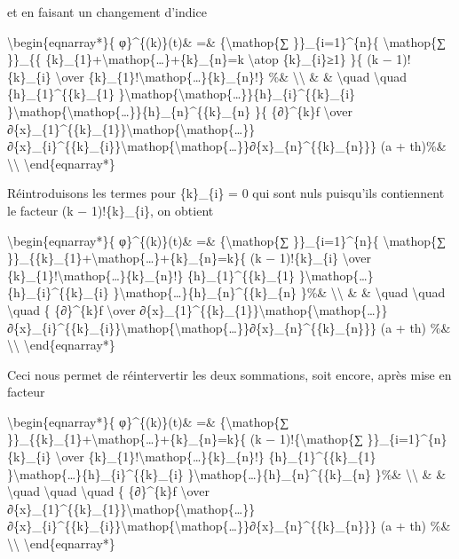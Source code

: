 \documentclass[]{article}
\begin{document}
et en faisant un changement d'indice

\textbackslash{}begin\{eqnarray*\}\{ φ\}\^{}\{(k)\}(t)\& =\&
\{\textbackslash{}mathop\{∑ \}\}\_\{i=1\}\^{}\{n\}\{
\textbackslash{}mathop\{∑ \}\}\_\{\{
\{k\}\_\{1\}+\textbackslash{}mathop\{\ldots{}\}+\{k\}\_\{n\}=k
\textbackslash{}atop \{k\}\_\{i\}≥1\} \}\{ (k − 1)!\{k\}\_\{i\}
\textbackslash{}over
\{k\}\_\{1\}!\textbackslash{}mathop\{\ldots{}\}\{k\}\_\{n\}!\} \%\&
\textbackslash{}\textbackslash{} \& \& \textbackslash{}quad
\textbackslash{}quad \{h\}\_\{1\}\^{}\{\{k\}\_\{1\}
\}\textbackslash{}mathop\{\textbackslash{}mathop\{\ldots{}\}\}\{h\}\_\{i\}\^{}\{\{k\}\_\{i\}
\}\textbackslash{}mathop\{\textbackslash{}mathop\{\ldots{}\}\}\{h\}\_\{n\}\^{}\{\{k\}\_\{n\}
\}\{ \{∂\}\^{}\{k\}f \textbackslash{}over
∂\{x\}\_\{1\}\^{}\{\{k\}\_\{1\}\}\textbackslash{}mathop\{\textbackslash{}mathop\{\ldots{}\}\}∂\{x\}\_\{i\}\^{}\{\{k\}\_\{i\}\}\textbackslash{}mathop\{\textbackslash{}mathop\{\ldots{}\}\}∂\{x\}\_\{n\}\^{}\{\{k\}\_\{n\}\}\}
(a + th)\%\& \textbackslash{}\textbackslash{}
\textbackslash{}end\{eqnarray*\}

Réintroduisons les termes pour \{k\}\_\{i\} = 0 qui sont nuls puisqu'ils
contiennent le facteur (k − 1)!\{k\}\_\{i\}, on obtient

\textbackslash{}begin\{eqnarray*\}\{ φ\}\^{}\{(k)\}(t)\& =\&
\{\textbackslash{}mathop\{∑ \}\}\_\{i=1\}\^{}\{n\}\{
\textbackslash{}mathop\{∑
\}\}\_\{\{k\}\_\{1\}+\textbackslash{}mathop\{\ldots{}\}+\{k\}\_\{n\}=k\}\{
(k − 1)!\{k\}\_\{i\} \textbackslash{}over
\{k\}\_\{1\}!\textbackslash{}mathop\{\ldots{}\}\{k\}\_\{n\}!\}
\{h\}\_\{1\}\^{}\{\{k\}\_\{1\}
\}\textbackslash{}mathop\{\ldots{}\}\{h\}\_\{i\}\^{}\{\{k\}\_\{i\}
\}\textbackslash{}mathop\{\ldots{}\}\{h\}\_\{n\}\^{}\{\{k\}\_\{n\}
\}\%\& \textbackslash{}\textbackslash{} \& \& \textbackslash{}quad
\textbackslash{}quad \textbackslash{}quad \{ \{∂\}\^{}\{k\}f
\textbackslash{}over
∂\{x\}\_\{1\}\^{}\{\{k\}\_\{1\}\}\textbackslash{}mathop\{\textbackslash{}mathop\{\ldots{}\}\}∂\{x\}\_\{i\}\^{}\{\{k\}\_\{i\}\}\textbackslash{}mathop\{\textbackslash{}mathop\{\ldots{}\}\}∂\{x\}\_\{n\}\^{}\{\{k\}\_\{n\}\}\}
(a + th) \%\& \textbackslash{}\textbackslash{}
\textbackslash{}end\{eqnarray*\}

Ceci nous permet de réintervertir les deux sommations, soit encore,
après mise en facteur

\textbackslash{}begin\{eqnarray*\}\{ φ\}\^{}\{(k)\}(t)\& =\&
\{\textbackslash{}mathop\{∑
\}\}\_\{\{k\}\_\{1\}+\textbackslash{}mathop\{\ldots{}\}+\{k\}\_\{n\}=k\}\{
(k − 1)!\{\textbackslash{}mathop\{∑ \}\}\_\{i=1\}\^{}\{n\}\{k\}\_\{i\}
\textbackslash{}over
\{k\}\_\{1\}!\textbackslash{}mathop\{\ldots{}\}\{k\}\_\{n\}!\}
\{h\}\_\{1\}\^{}\{\{k\}\_\{1\}
\}\textbackslash{}mathop\{\ldots{}\}\{h\}\_\{i\}\^{}\{\{k\}\_\{i\}
\}\textbackslash{}mathop\{\ldots{}\}\{h\}\_\{n\}\^{}\{\{k\}\_\{n\}
\}\%\& \textbackslash{}\textbackslash{} \& \& \textbackslash{}quad
\textbackslash{}quad \textbackslash{}quad \{ \{∂\}\^{}\{k\}f
\textbackslash{}over
∂\{x\}\_\{1\}\^{}\{\{k\}\_\{1\}\}\textbackslash{}mathop\{\textbackslash{}mathop\{\ldots{}\}\}∂\{x\}\_\{i\}\^{}\{\{k\}\_\{i\}\}\textbackslash{}mathop\{\textbackslash{}mathop\{\ldots{}\}\}∂\{x\}\_\{n\}\^{}\{\{k\}\_\{n\}\}\}
(a + th) \%\& \textbackslash{}\textbackslash{}
\textbackslash{}end\{eqnarray*\}
\end{document}
